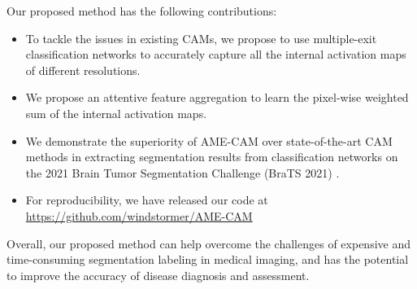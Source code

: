 Our proposed method has the following contributions:
\begin{itemize}
\item To tackle the issues in existing CAMs, we propose to use multiple-exit classification networks to accurately capture all the internal activation maps of different resolutions.
\item We propose an attentive feature aggregation to learn the pixel-wise weighted sum of the internal activation maps.
\item We demonstrate the superiority of AME-CAM over state-of-the-art CAM methods in extracting segmentation results from classification networks on the 2021 Brain Tumor Segmentation Challenge (BraTS 2021) \cite{menze2014multimodal,bakas2017advancing,bakas2018identifying}.
\item For reproducibility, we have released our code at \\ \href{https://github.com/windstormer/AME-CAM}{https://github.com/windstormer/AME-CAM}
\end{itemize}

Overall, our proposed method can help overcome the challenges of expensive and time-consuming segmentation labeling in medical imaging, and has the potential to improve the accuracy of disease diagnosis and assessment.
